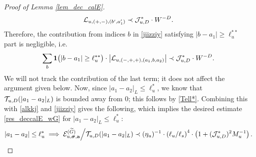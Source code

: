 \begin{proof}[Proof of Lemma \ref{lem_dec_calE}]
$$
{\cal L}_{u,(+,-),{(b',a_1')}} \prec {\cal J}^*_{u,D}\cdot W^{-D}.
$$
Therefore, the contribution from indices $b$ in \eqref{jiizziy} satisfying $|b-a_1|\ge  \ell_u^{** }$ part is negligible, i.e.
\begin{align}\label{alkkj2}
 \sum_{b }{\bf 1}\big(|b-a_1|\ge  \ell_u^{** }\big)\cdot  \left|{\cal L}_{u, (-,+,+),(a_1, b , a_2)}\right|\prec  {\cal J}^*_{u,D}\cdot W^{-D}. 
\end{align}
We will not track the contribution of the last term; it does not affect the argument given below. Now, since $|a_{1}-a_{2}|_{L}\leq\ell_{u}^{\ast}$, we know that ${\cal T}_{u,D}(|a_{1}-a_{2}|_{L})$ is bounded away from $0$; this follows by \eqref{Tell*}. Combining this with \eqref{alkkj} and  \eqref{jiizziy} gives the following, which implies the desired estimate \eqref{res_deccalE_wG} for $|a_1-a_2|_{L}\le \ell_u^*$:
\begin{align}\label{82jjdopasj}
 |a_1-a_2|\le \ell_u^*\implies  \mathcal{E}_{u, \boldsymbol{\sigma}, \mathbf{a}}^{(\widetilde{G})} \Big/{\cal T}_{u,D}(|a_1-a_2|_{L})\prec 
 (\eta_u)^{-1} \cdot \left(\ell_u / \ell_s\right)^4\cdot   \left(1+  (\mathcal{J}_{u, D}^*)^2  M_{u}^{-1 }\right).
 \end{align}


\end{proof}
